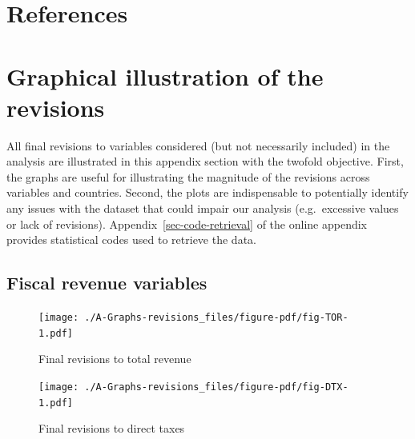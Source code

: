 \documentclass[
  letterpaper,
  authoryear,
  preprint,
  3p]{elsarticle}
\newlength{\cslhangindent}
\newlength{\cslentryspacingunit} %
\newenvironment{CSLReferences}[2] %
 {%
  \setlength{\parindent}{0pt}
  \ifodd #1
  \let\oldpar\par
  \def\par{\hangindent=\cslhangindent\oldpar}
  \fi
  \setlength{\parskip}{#2\cslentryspacingunit}
 }%
 {}
\begin{document}

\hypertarget{references}{%
\chapter*{References}\label{references}}


\hypertarget{refs}{}
\begin{CSLReferences}{0}{0}
\end{CSLReferences}

\cleardoublepage
{}
{}
\appendix

\hypertarget{sec-Revisions-illustration}{%
\chapter{Graphical illustration of the
revisions}\label{sec-Revisions-illustration}}

All final revisions to variables considered (but not necessarily
included) in the analysis are illustrated in this appendix section with
the twofold objective. First, the graphs are useful for illustrating the
magnitude of the revisions across variables and countries. Second, the
plots are indispensable to potentially identify any issues with the
dataset that could impair our analysis (e.g.~excessive values or lack of
revisions). Appendix~\ref{sec-code-retrieval} of the online appendix
provides statistical codes used to retrieve the data.

\hypertarget{fiscal-revenue-variables}{%
\section{Fiscal revenue variables}\label{fiscal-revenue-variables}}

\begin{figure}[H]

{\centering \texttt{[image: ./A-Graphs-revisions\_files/figure-pdf/fig-TOR-1.pdf]}

}

\caption{\label{fig-TOR}Final revisions to total revenue}

\end{figure}

\pagebreak

\begin{figure}[H]

{\centering \texttt{[image: ./A-Graphs-revisions\_files/figure-pdf/fig-DTX-1.pdf]}

}

\caption{\label{fig-DTX}Final revisions to direct taxes}

\end{figure}
\end{document}
